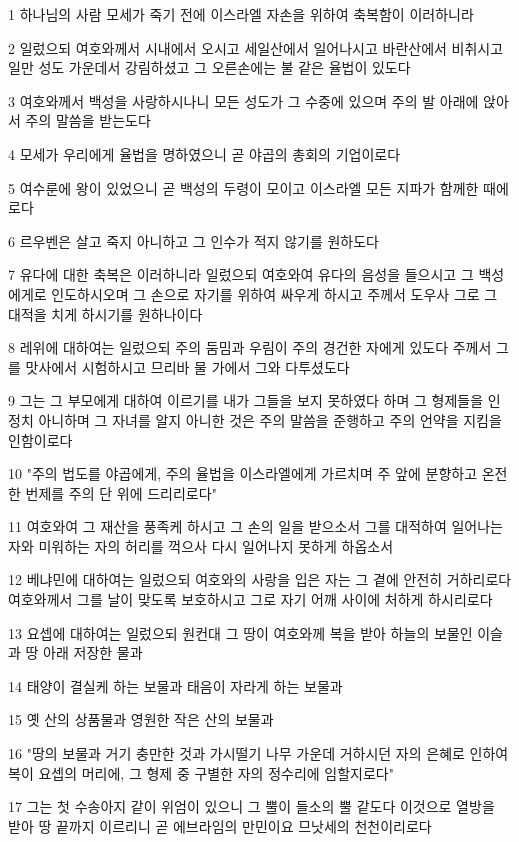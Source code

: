 \par 1 하나님의 사람 모세가 죽기 전에 이스라엘 자손을 위하여 축복함이 이러하니라
\par 2 일렀으되 여호와께서 시내에서 오시고 세일산에서 일어나시고 바란산에서 비취시고 일만 성도 가운데서 강림하셨고 그 오른손에는 불 같은 율법이 있도다
\par 3 여호와께서 백성을 사랑하시나니 모든 성도가 그 수중에 있으며 주의 발 아래에 앉아서 주의 말씀을 받는도다
\par 4 모세가 우리에게 율법을 명하였으니 곧 야곱의 총회의 기업이로다
\par 5 여수룬에 왕이 있었으니 곧 백성의 두령이 모이고 이스라엘 모든 지파가 함께한 때에로다
\par 6 르우벤은 살고 죽지 아니하고 그 인수가 적지 않기를 원하도다
\par 7 유다에 대한 축복은 이러하니라 일렀으되 여호와여 유다의 음성을 들으시고 그 백성에게로 인도하시오며 그 손으로 자기를 위하여 싸우게 하시고 주께서 도우사 그로 그 대적을 치게 하시기를 원하나이다
\par 8 레위에 대하여는 일렀으되 주의 둠밈과 우림이 주의 경건한 자에게 있도다 주께서 그를 맛사에서 시험하시고 므리바 물 가에서 그와 다투셨도다
\par 9 그는 그 부모에게 대하여 이르기를 내가 그들을 보지 못하였다 하며 그 형제들을 인정치 아니하며 그 자녀를 알지 아니한 것은 주의 말씀을 준행하고 주의 언약을 지킴을 인함이로다
\par 10 "주의 법도를 야곱에게, 주의 율법을 이스라엘에게 가르치며 주 앞에 분향하고 온전한 번제를 주의 단 위에 드리리로다"
\par 11 여호와여 그 재산을 풍족케 하시고 그 손의 일을 받으소서 그를 대적하여 일어나는 자와 미워하는 자의 허리를 꺽으사 다시 일어나지 못하게 하옵소서
\par 12 베냐민에 대하여는 일렀으되 여호와의 사랑을 입은 자는 그 곁에 안전히 거하리로다 여호와께서 그를 날이 맞도록 보호하시고 그로 자기 어깨 사이에 처하게 하시리로다
\par 13 요셉에 대하여는 일렀으되 원컨대 그 땅이 여호와께 복을 받아 하늘의 보물인 이슬과 땅 아래 저장한 물과
\par 14 태양이 결실케 하는 보물과 태음이 자라게 하는 보물과
\par 15 옛 산의 상품물과 영원한 작은 산의 보물과
\par 16 "땅의 보물과 거기 충만한 것과 가시떨기 나무 가운데 거하시던 자의 은혜로 인하여 복이 요셉의 머리에, 그 형제 중 구별한 자의 정수리에 임할지로다"
\par 17 그는 첫 수송아지 같이 위엄이 있으니 그 뿔이 들소의 뿔 같도다 이것으로 열방을 받아 땅 끝까지 이르리니 곧 에브라임의 만민이요 므낫세의 천천이리로다
